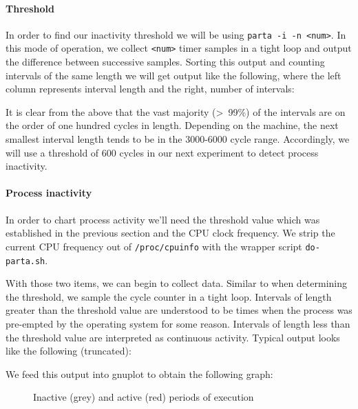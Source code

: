 \documentclass{article}
\begin{document}
\paragraph{Threshold}
In order to find our inactivity threshold we will be using
\lstinline{parta -i -n <num>}. In this mode of operation, we collect
\lstinline{<num>} timer samples in a tight loop and output the difference
between successive samples. Sorting this output and counting intervals of the
same length we will get output like the following, where the left column
represents interval length and the right, number of intervals:
\begin{framed}
    \label{lst:intervals}
    
\end{framed}

It is clear from the above that the vast majority (\textgreater~99\%) of the
intervals are on the order of one hundred cycles in length. Depending on the
machine, the next smallest interval length tends to be in the 3000-6000 cycle
range. Accordingly, we will use a threshold of 600 cycles in our next
experiment to detect process inactivity.

\paragraph{Process inactivity}
In order to chart process activity we'll need the threshold value which was
established in the previous section and the CPU clock frequency. We strip the
current CPU frequency out of \lstinline{/proc/cpuinfo} with the wrapper script
\lstinline{do-parta.sh}.

With those two items, we can begin to collect data. Similar to when determining
the threshold, we sample the cycle counter in a tight loop. Intervals
of length greater than the threshold value are understood to be times when the
process was pre-empted by the operating system for some reason. Intervals
of length less than the threshold value are interpreted as continuous
activity. Typical output looks like the following (truncated):
\begin{framed}
    \label{lst:inactive}
    
\end{framed}

We feed this output into gnuplot to obtain the following graph:
\begin{center}
    \begin{figure}[h]
        \label{fig:inactive}
        \caption{Inactive (grey) and active (red) periods of execution}
        
    \end{figure}
\end{center}
\end{document}
